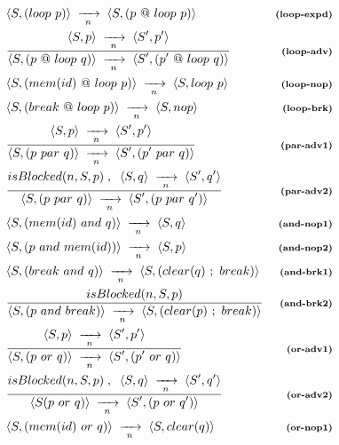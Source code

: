 \documentclass{acm_proc_article-sp}
\newcommand{\ST}{\1\xrightarrow[~n~]{}\1}
\newcommand{\LL}{\langle}
\newcommand{\RR}{\rangle}
\newcommand{\DS}{\displaystyle}
\newcommand{\rr}[1] {{\textbf{\scriptsize{#1}}}}
\newcommand{\1}{\;}
\newcommand{\2}{\;\;}
\newcommand{\3}{\;\;\;}
\newcommand{\5}{\;\;\;\;\;}
\begin{document}
\begin{figure}
{\begin{eqnarray*}
& \LL S, (loop~p) \RR \ST \LL S, (p~@~loop~p) \RR
    & \rr{(loop-expd)}       \\
& \frac
    {\DS \LL S,p \RR \ST \LL S',p' \RR }
    {\DS \LL S, (p~@~loop~q) \RR \ST \LL S', (p'~@~loop~q) \RR }
    & \rr{(loop-adv)}    \\
& \LL S, (mem(id)~@~loop~p) \RR \ST \LL S, loop~p \RR
    & \rr{(loop-nop)}    \\
& \LL S, (break~@~loop~p) \RR \ST \LL S, nop \RR
    & \rr{(loop-brk)}       \\
%
& \frac
    {\DS \LL S,p \RR \ST \LL S',p' \RR }
    {\DS \LL S, (p~par~q) \RR \ST \LL S', (p'~par~q) \RR }
    & \rr{(par-adv1)}      \\
& \frac
    {\DS isBlocked(n,S,p) \1,\2 \LL S,q \RR \ST \LL S',q' \RR }
    {\DS \LL S, (p~par~q) \RR \ST \LL S', (p~par~q') \RR }
    & \rr{(par-adv2)}      \\
& \LL S, (mem(id)~and~q) \RR \ST \LL S, q \RR
    & \rr{(and-nop1)}   \\
& \LL S, (p~and~mem(id)) \RR \ST \LL S, p \RR
    & \rr{(and-nop2)}   \\
& \LL S, (break~and~q) \RR \ST \LL S, (clear(q)~;~break) \RR
    & \rr{(and-brk1)}   \\
& \frac
    {\DS isBlocked(n,S,p) }
    {\DS \LL S, (p~and~break) \RR \ST \LL S, (clear(p)~;~break) \RR }
    & \rr{(and-brk2)}   \\
%
%
& \frac
    {\DS \LL S,p \RR \ST \LL S',p' \RR }
    {\DS \LL S, (p~or~q) \RR \ST \LL S', (p'~or~q) \RR }
    & \rr{(or-adv1)}   \\
& \frac
    {\DS isBlocked(n,S,p) \1,\2 \LL S,q \RR \ST \LL S',q' \RR }
    {\DS \LL S (p~or~q) \RR \ST \LL S', (p~or~q') \RR }
    & \rr{(or-adv2)}   \\
& \LL S, (mem(id)~or~q) \RR \ST \LL S, clear(q) \RR
    & \rr{(or-nop1)}   \\

\end{eqnarray*}}
\end{figure}
\end{document}
